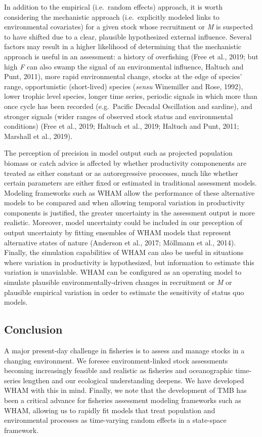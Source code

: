 \documentclass[]{article}
\begin{document}
In addition to the empirical (i.e.~random effects) approach, it is worth
considering the mechanistic approach (i.e.~explicitly modeled links to
environmental covariates) for a given stock whose recruitment or
\emph{M} is suspected to have shifted due to a clear, plausible
hypothesized external influence. Several factors may result in a higher
likelihood of determining that the mechanistic approach is useful in an
assessment: a history of overfishing (Free et al., 2019; but high
\emph{F} can also swamp the signal of an environmental influence,
Haltuch and Punt, 2011), more rapid environmental change, stocks at the
edge of species' range, opportunistic (short-lived) species
(\emph{sensu} Winemiller and Rose, 1992), lower trophic level species,
longer time series, periodic signals in which more than once cycle has
been recorded (e.g.~Pacific Decadal Oscillation and sardine), and
stronger signals (wider ranges of observed stock status and
environmental conditions) (Free et al., 2019; Haltuch et al., 2019;
Haltuch and Punt, 2011; Marshall et al., 2019).

The perception of precision in model output such as projected population
biomass or catch advice is affected by whether productivity componenents
are treated as either constant or as autoregressive processes, much like
whether certain parameters are either fixed or estimated in traditional
assessment models. Modeling frameworks such as WHAM allow the
performance of these alternative models to be compared and when allowing
temporal variation in productivity components is justified, the greater
uncertainty in the assessment output is more realistic. Moreover, model
uncertainty could be included in our preception of output uncertainty by
fitting ensembles of WHAM models that represent alternative states of
nature (Anderson et al., 2017; Möllmann et al., 2014). Finally, the
simulation capabilities of WHAM can also be useful in situations where
variation in productivity is hypothesized, but information to estimate
this variation is unavialable. WHAM can be configured as an operating
model to simulate plausible environmentally-driven changes in
recruitment or \emph{M} or plausible empirical variation in order to
estimate the sensitivity of status quo models.

\hypertarget{conclusion}{%
\subsection{Conclusion}\label{conclusion}}

A major present-day challenge in fisheries is to assess and manage
stocks in a changing environment. We foresee environment-linked stock
assessments becoming increasingly feasible and realistic as fisheries
and oceanographic time-series lengthen and our ecological understanding
deepens. We have developed WHAM with this in mind. Finally, we note that
the development of TMB has been a critical advance for fisheries
assessment modeling frameworks such as WHAM, allowing us to rapidly fit
models that treat population and environmental processes as time-varying
random effects in a state-space framework.
\end{document}
